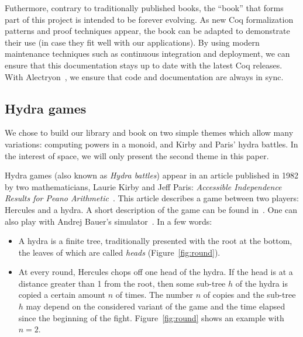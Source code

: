 \documentclass{easychair}
\newcommand{\coq}{Coq\xspace}
\newcommand{\alectr}{Alectryon\xspace}
\begin{document}
Futhermore, contrary to traditionally published books, the ``book'' that forms part of this project is intended to be forever evolving. As new \coq formalization patterns and proof techniques appear, the book can be adapted to demonstrate their use (in case they fit well with our applications).
%
By using modern maintenance techniques such as continuous integration and deployment, we can ensure that this documentation stays up to date with the latest \coq releases. With \alectr~\cite{alectryonpaper, alectryongithub}, we ensure that code and documentation are always in sync.

\subsection{Hydra games}

We chose to build our library and book on two simple themes which allow many variations: computing powers in a monoid, and Kirby and Paris' hydra battles. In the interest of space, we will only present the second theme in this paper.


Hydra games (also known as \emph{Hydra battles}) appear in an article published in 1982 by two mathematicians, 
Laurie Kirby and Jeff Paris: \emph{Accessible Independence Results for Peano Arithmetic}~\cite{KP82}.
This article describes a game between two players: Hercules and a hydra.
A short description of the game  can be found in~\cite{bauer2008, KP82, JFLA2018paper}. One can also play with
Andrej Bauer's simulator~\cite{BauerHydra}.
In a few words:
\begin{itemize}
\item A hydra is a finite tree, traditionally presented with the root at the bottom, the leaves of which are called \emph{heads}
  (Figure~\ref{fig:round}).
\item At every round, Hercules chops off one head of the hydra. If the head is at a distance greater than 1 from the root,
  then some sub-tree $h$ of the hydra is copied a certain amount $n$ of times. The number $n$ of copies and the sub-tree $h$ may depend on the considered variant of the game
  and the time elapsed since the beginning of the fight.
  Figure~\ref{fig:round} shows an example with $n=2$.
\end{itemize}
\end{document}
